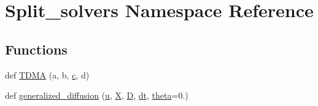 \hypertarget{namespaceSplit__solvers}{}\section{Split\+\_\+solvers Namespace Reference}
\label{namespaceSplit__solvers}
\subsection*{Functions}
\begin{DoxyCompactItemize}
\item 
def \hyperlink{namespaceSplit__solvers_afbe15271a0fe5821bdfe8760325cb4bb}{T\+D\+MA} (a, b, \hyperlink{namespaceSplit__solvers_a8d99b01f11e92c25fdef25ee372ef15e}{c}, d)
\item 
def \hyperlink{namespaceSplit__solvers_a220613cf00c68055fb1d6c976dc0ec1d}{generalized\+\_\+diffusion} (\hyperlink{namespaceSplit__solvers_abe87b0440e65cc15867b535fe5594457}{u}, \hyperlink{namespaceSplit__solvers_a1884fc9efd3f156e55b75a45f19d7244}{X}, \hyperlink{namespaceSplit__solvers_a0bcad395b64a658c374ba8a3fb893836}{D}, \hyperlink{namespaceSplit__solvers_a9d7802821157fdbfdde000b24e2ed31b}{dt}, \hyperlink{cr__source_8h_a91a3bf9ce71325c8a7cbd31d8c474bff}{theta}=0.)
\end{DoxyCompactItemize}

